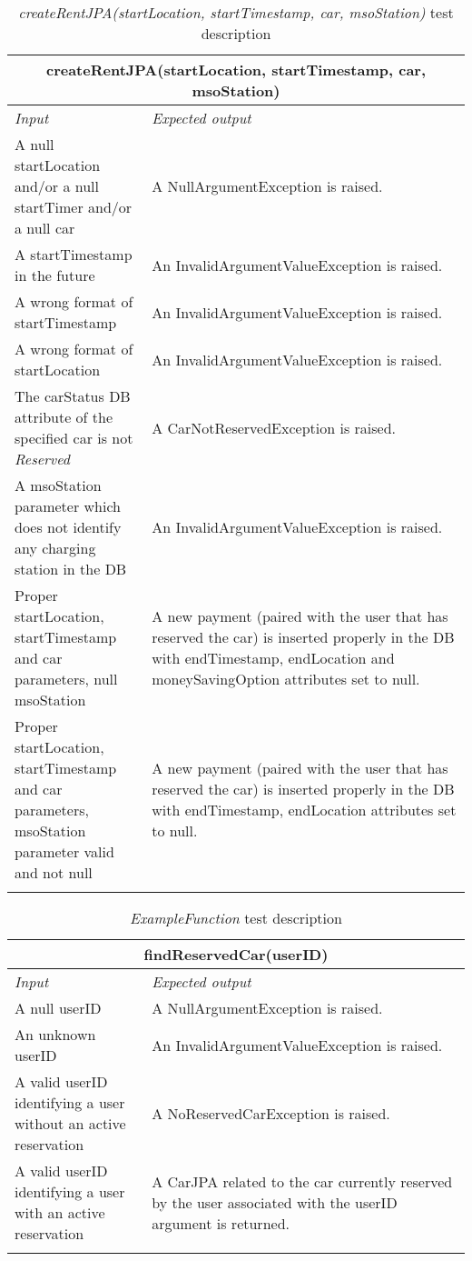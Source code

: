 \begin{longtable}{p{0.3\linewidth}p{0.7\linewidth}}
\multicolumn{2}{c}{\textbf{createRentJPA(startLocation, startTimestamp, car, msoStation)}} \\
\toprule
\emph{Input} & \emph{Expected output} \\
\midrule
A null startLocation and/or a null startTimer and/or a null car & A NullArgumentException is raised.\\
\midrule
A startTimestamp in the future & An InvalidArgumentValueException is raised. \\
\midrule
A wrong format of startTimestamp & An InvalidArgumentValueException is raised. \\
\midrule
A wrong format of startLocation & An InvalidArgumentValueException is raised. \\
\midrule
The carStatus DB attribute of the specified car is not \emph{Reserved} & A CarNotReservedException is raised. \\
\midrule
A msoStation parameter which does not identify any charging station in the DB & An InvalidArgumentValueException is raised. \\
\midrule
Proper startLocation, startTimestamp and car parameters, null msoStation & A new payment (paired with the user that has reserved the car) is inserted properly in the DB with endTimestamp, endLocation and moneySavingOption attributes set to null.\\
\midrule
Proper \mbox{startLocation}, startTimestamp and car parameters, \mbox{msoStation} parameter valid and not null & A new payment (paired with the user that has reserved the car) is inserted properly in the DB with endTimestamp, endLocation attributes set to null.\\
\bottomrule
\caption{\emph{createRentJPA(startLocation, startTimestamp, car, msoStation)} test description}
\end{longtable}

\begin{longtable}{p{0.3\linewidth}p{0.7\linewidth}}
\multicolumn{2}{c}{\textbf{findReservedCar(userID)}} \\
\toprule
\emph{Input} & \emph{Expected output} \\
\midrule
A null userID & A NullArgumentException is raised.\\
\midrule
An unknown userID  & An InvalidArgumentValueException is raised. \\
\midrule
A valid userID identifying a user without an active reservation & A NoReservedCarException is raised. \\
\midrule
A valid userID identifying a user with an active reservation & A CarJPA related to the car currently reserved by the user associated with the userID argument is returned.\\
\bottomrule
\caption{\emph{ExampleFunction} test description}
\end{longtable}


